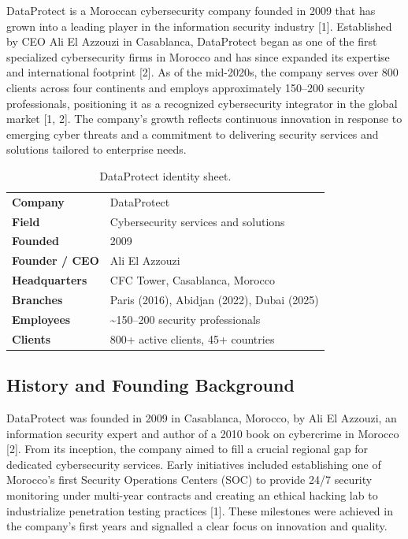 \documentclass[12pt]{article}
\begin{document}
DataProtect is a Moroccan cybersecurity company founded in 2009 that has grown
into a leading player in the information security industry [1]. Established by
CEO Ali El Azzouzi in Casablanca, DataProtect began as one of the first
specialized cybersecurity firms in Morocco and has since expanded its expertise
and international footprint [2]. As of the mid-2020s, the company serves over
800 clients across four continents and employs approximately 150--200 security
professionals, positioning it as a recognized cybersecurity integrator in the
global market [1, 2]. The company's growth reflects continuous innovation in
response to emerging cyber threats and a commitment to delivering security
services and solutions tailored to enterprise needs.

\begin{table}[h]
\centering
\begin{tabular}{@{}ll@{}}
\textbf{Company} & DataProtect \\
\textbf{Field} & Cybersecurity services and solutions \\
\textbf{Founded} & 2009 \\
\textbf{Founder / CEO} & Ali El Azzouzi \\
\textbf{Headquarters} & CFC Tower, Casablanca, Morocco \\
\textbf{Branches} & Paris (2016), Abidjan (2022), Dubai (2025) \\
\textbf{Employees} & \textasciitilde150--200 security professionals \\
\textbf{Clients} & 800+ active clients, 45+ countries \\
\end{tabular}
\caption{DataProtect identity sheet.}
\label{tab:dataprotect-identity}
\end{table}

\subsection{History and Founding Background}

DataProtect was founded in 2009 in Casablanca, Morocco, by Ali El Azzouzi, an
information security expert and author of a 2010 book on cybercrime in Morocco
[2]. From its inception, the company aimed to fill a crucial regional gap for
dedicated cybersecurity services. Early initiatives included establishing one
of Morocco's first Security Operations Centers (SOC) to provide 24/7 security
monitoring under multi-year contracts and creating an ethical hacking lab to
industrialize penetration testing practices [1]. These milestones were achieved
in the company's first years and signalled a clear focus on innovation and
quality.
\end{document}
